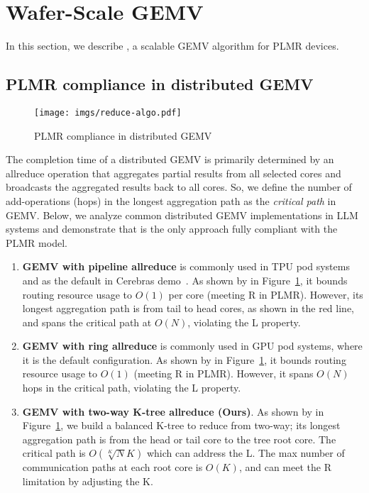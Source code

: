 \vspace{-0.3cm}
\section{Wafer-Scale GEMV}\label{sec:gemv}
\vspace{-0.2cm}

In this section, we describe \gemv, a scalable GEMV algorithm for PLMR devices.


\subsection{PLMR compliance in distributed GEMV}

\begin{figure}[t!]
    \centering
    \texttt{[image: imgs/reduce-algo.pdf]}
    \caption{PLMR compliance in distributed GEMV}
    \label{fig:gemv-plmr-compliance}
\end{figure}

The completion time of a distributed GEMV is primarily determined by an allreduce operation that aggregates partial results from all selected cores and broadcasts the aggregated results back to all cores. So, we define the number of add-operations (hops) in the longest aggregation path as the \emph{critical path} in GEMV. Below, we analyze common distributed GEMV implementations in LLM systems and demonstrate that \gemv is the only approach fully compliant with the PLMR model.

\begin{enumerate}[label=(\arabic*), leftmargin=0.5cm, noitemsep,topsep=0pt]

 \item \textbf{GEMV with pipeline allreduce} is commonly used in TPU pod systems~\cite{google2023efficiently} and as the default in Cerebras demo~\cite{cerebrasgemv}. As shown by  in Figure~\ref{fig:gemv-plmr-compliance}, it bounds routing resource usage to $O(1)$ per core (meeting R in PLMR). However, its longest aggregation path is from tail to head cores, as shown in the red line, and spans the critical path at $O(N)$, violating the L property.

\item \textbf{GEMV with ring allreduce} is commonly used in GPU pod systems, where it is the default configuration. As shown by  in Figure~\ref{fig:gemv-plmr-compliance}, it bounds routing resource usage to $O(1)$ (meeting R in PLMR). However, it spans $O(N)$ hops in the critical path, violating the L property.

\item \textbf{GEMV with two-way K-tree allreduce (Ours)}. As shown by  in Figure~\ref{fig:gemv-plmr-compliance}, we build a balanced K-tree to reduce from two-way; its longest aggregation path is from the head or tail core to the tree root core. The critical path is $O(\sqrt[K]{N}K)$ which can address the L. The max number of communication paths at each root core is $O(K)$, and can meet the R limitation by adjusting the K.

\end{enumerate}


